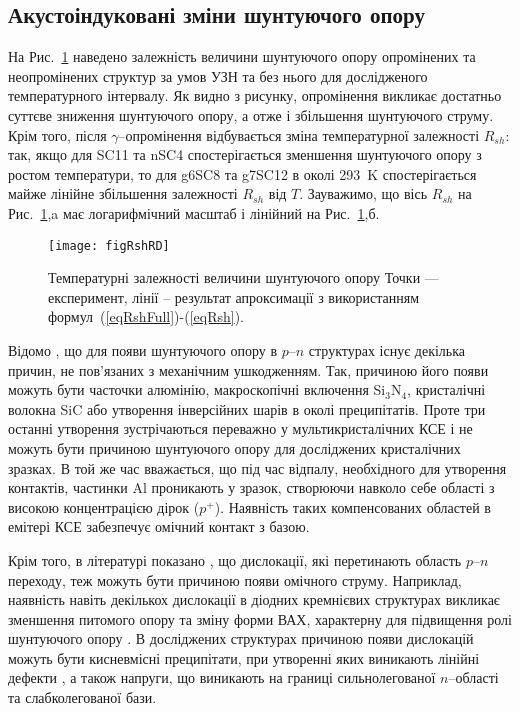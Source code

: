 \subsection{Акустоіндуковані зміни шунтуючого опору\label{sbRsh}}

На Рис.~\ref{figRshRD} наведено залежність величини шунтуючого опору опромінених та неопромінених структур
за умов УЗН та без нього для дослідженого температурного інтервалу.
Як видно з рисунку, опромінення викликає достатньо суттєве зниження шунтуючого опору, а отже
і збільшення шунтуючого струму.
Крім того, після $\gamma$--опромінення відбувається зміна температурної залежності $R_{sh}$:
так, якщо для SC11 та nSC4 спостерігається зменшення шунтуючого опору з ростом температури,
то для g6SC8 та g7SC12 в околі 293~K спостерігається майже лінійне збільшення залежності
$R_{sh}$ від $T$.
Зауважимо, що вісь $R_{sh}$ на Рис.~\ref{figRshRD},a має логарифмічний масштаб і лінійний на  Рис.~\ref{figRshRD},б.


\begin{figure}
\center
\texttt{[image: figRshRD]}
\caption{\label{figRshRD}
Температурні залежності величини шунтуючого опору
\FigCaptionSSCRD
Точки --- експеримент,
лінії -- результат апроксимації з використанням формул~(\ref{eqRshFull})-(\ref{eqRsh}).
}%
\end{figure}

Відомо \cite{Rsh:Breitenstein,RshMet,Breitenstein2013}, що для появи шунтуючого опору в $p$--$n$ структурах існує декілька причин, не
пов'язаних з механічним ушкодженням.
Так, причиною його появи можуть бути часточки алюмінію, макроскопічні включення Si$_3$N$_4$, кристалічні волокна SiC або утворення інверсійних шарів
в околі преципітатів.
Проте три  останні утворення зустрічаються переважно у мультикристалічних КСЕ \cite{Rsh:Breitenstein,Breitenstein2013} і не можуть
бути причиною шунтуючого опору для досліджених кристалічних зразках.
В той же час вважається, що під час відпалу, необхідного для утворення контактів, частинки Al проникають у зразок,
створюючи навколо себе області з високою концентрацією дірок ($p^+$).
Наявність таких компенсованих областей в емітері КСЕ  забезпечує омічний контакт з базою.

Крім того, в літературі показано \cite{Rsh:Breitenstein,TAT:Gopal,Rsh:Baker,Si:dislIV},
що дислокації, які перетинають область $p$--$n$ переходу, теж можуть бути причиною появи омічного струму.
Наприклад, наявність навіть декількох дислокації в діодних кремнієвих структурах викликає зменшення питомого опору
та зміну форми ВАХ, характерну для підвищення ролі шунтуючого опору \cite{Si:dislIV}.
В досліджених структурах причиною появи дислокацій можуть бути кисневмісні преципітати, при утворенні яких
виникають лінійні дефекти \cite{SiO:Hwang,SiO:Vanhell}, а також напруги, що виникають
на границі сильнолегованої $n$--області та слабколегованої бази.

